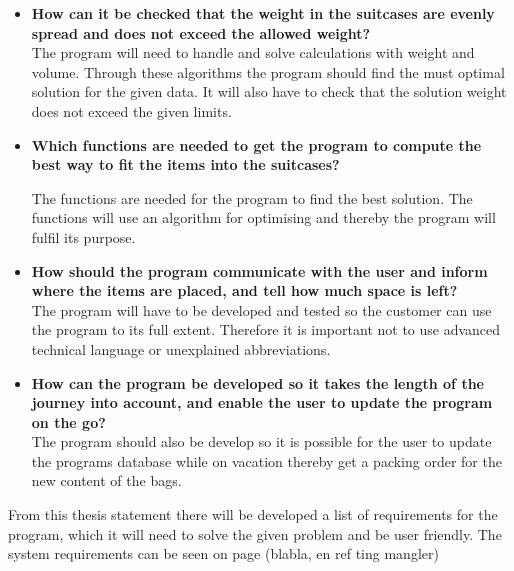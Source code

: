 \begin{itemize}
\item \textbf{How can it be checked that the weight in the suitcases are evenly spread and does not exceed the allowed weight?}\\

The program will need to handle and solve calculations with weight and volume. Through these algorithms the program should find the must optimal solution for the given data. It will also have to check that the solution weight does not exceed the given limits.

\item \textbf{Which functions are needed to get the program to compute the best way to fit the items into the suitcases?}\newline

The functions are needed for the program to find the best solution. The functions will use an algorithm for optimising and thereby the program will fulfil its purpose.

\item \textbf{How should the program communicate with the user and inform where the items are placed, and tell how much space is left?}\\

The program will have to be developed and tested so the customer can use the program to its full extent. Therefore it is important not to use advanced technical language or unexplained abbreviations.

\item \textbf{How can the program be developed so it takes the length of the journey  into account, and enable the user to update the program on the go?}\\

The program should also be develop so it is possible for the user to update the programs database while on vacation thereby get a packing order for the new content of the bags.
\end{itemize}

From this thesis statement there will be developed a list of requirements for the program, which it will need to solve the given problem and be user friendly. The system requirements can be seen on page (blabla, en ref ting mangler)

